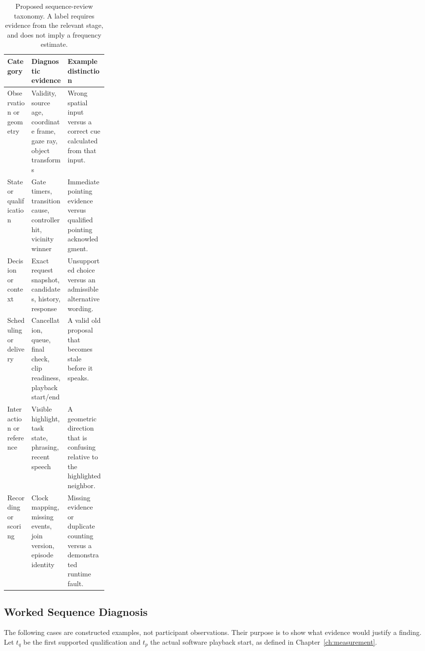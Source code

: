\begin{table}[htbp]\centering
\caption[Failure categories and diagnostic evidence]{Proposed sequence-review taxonomy. A label requires evidence from the relevant stage, and does not imply a frequency estimate.}
\label{tab:failure-taxonomy}
\small{}
\begin{tabularx}{\linewidth}{@{}p{0.24\linewidth}XX@{}}\toprule
Category & Diagnostic evidence & Example distinction \\\midrule
Observation or geometry & Validity, source age, coordinate frame, gaze ray, object transforms & Wrong spatial input versus a correct cue calculated from that input. \\
State or qualification & Gate timers, transition cause, controller hit, vicinity winner & Immediate pointing evidence versus qualified pointing acknowledgment. \\
Decision or context & Exact request snapshot, candidates, history, response & Unsupported choice versus an admissible alternative wording. \\
Scheduling or delivery & Cancellation, queue, final check, clip readiness, playback start/end & A valid old proposal that becomes stale before it speaks. \\
Interaction or reference & Visible highlight, task state, phrasing, recent speech & A geometric direction that is confusing relative to the highlighted neighbor. \\
Recording or scoring & Clock mapping, missing events, join version, episode identity & Missing evidence or duplicate counting versus a demonstrated runtime fault. \\\bottomrule
\end{tabularx}
\end{table}

\subsection{Worked Sequence Diagnosis}
The following cases are constructed examples, not participant observations. Their purpose is to show what evidence would justify a finding. Let $t_q$ be the first supported qualification and $t_p$ the actual software playback start, as defined in Chapter~\ref{ch:measurement}.

